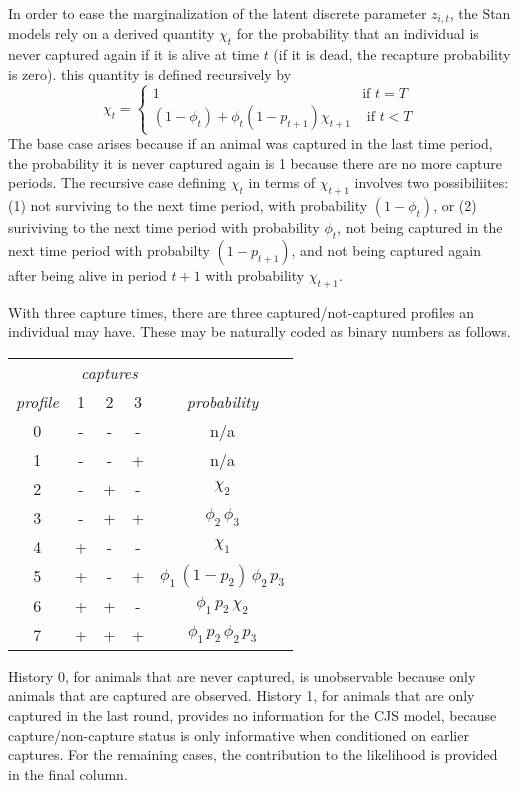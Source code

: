 In order to ease the marginalization of the latent discrete parameter
$z_{i,t}$, the Stan models rely on a derived quantity $\chi_t$ for
the probability that an individual is never captured again if it is
alive at time $t$ (if it is dead, the recapture probability is zero).
this quantity is defined recursively by
\[
\chi_t 
= 
\begin{cases}
1 
& \mbox{if } t = T
\\[3pt]
(1 - \phi_t) + \phi_t (1 - p_{t+1}) \chi_{t+1}
& \mbox{ if } t < T
\end{cases}
\]
%
The base case arises because if an animal was captured in the last
time period, the probability it is never captured again is 1 because
there are no more capture periods.  The recursive case defining
$\chi_{t}$ in terms of $\chi_{t+1}$ involves two possibiliites: (1)
not surviving to the next time period, with probability $(1 -
\phi_t)$, or (2) suriviving to the next time period with probability
$\phi_t$, not being captured in the next time period with probabilty
$(1 - p_{t+1})$, and not being captured again after being alive in
period $t+1$ with probability $\chi_{t+1}$. 

With three capture times, there are three captured/not-captured
profiles an individual may have.  These may be naturally coded as
binary numbers as follows.
%
\begin{center}
\begin{tabular}{c|ccc|c}
& \multicolumn{3}{|c|}{{\it captures}}
\\
{\it profile} & 1 & 2 & 3 & {\it probability}
\\ \hline
{0} & - & - & - & n/a
\\
{1} & - & - & + & n/a
\\ \hline
{2} & - & + & - & $\chi_2$
\\
{3} & - & + & + & $\phi_2 \, \phi_3$
\\ \hline
{4} & + & - & - & $\chi_1$
\\
{5} & + & - & + & $\phi_1 \, (1 - p_2) \, \phi_2 \, p_3$
\\ \hline
{6} & + & + & - & $ \phi_1 \, p_2 \, \chi_2$
\\ 
{7} & + & + & + & $\phi_1 \, p_2 \, \phi_2 \, p_3$
\end{tabular}
\end{center}
%
History 0, for animals that are never captured, is unobservable
because only animals that are captured are observed. History 1, for
animals that are only captured in the last round, provides no
information for the CJS model, because capture/non-capture status is
only informative when conditioned on earlier captures.  For the
remaining cases, the contribution to the likelihood is provided in the
final column.


